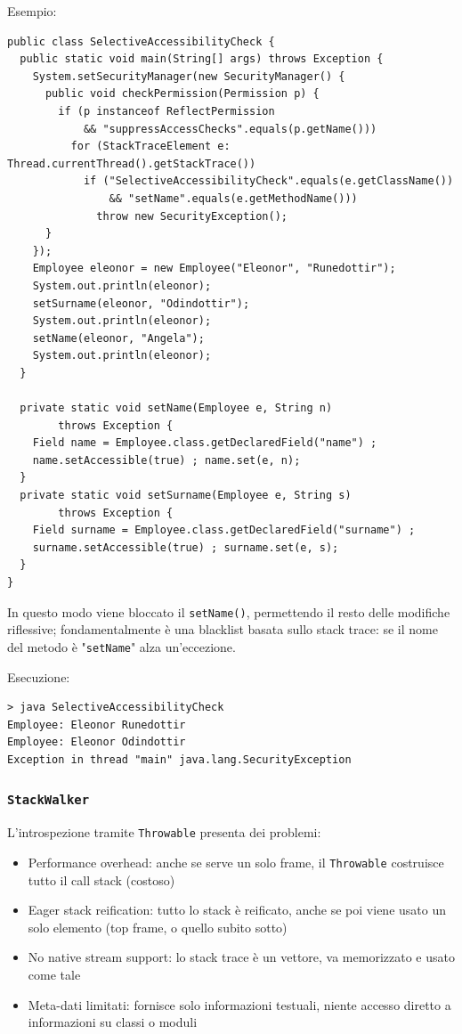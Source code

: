 Esempio:
\begin{verbatim}
public class SelectiveAccessibilityCheck {
  public static void main(String[] args) throws Exception {
    System.setSecurityManager(new SecurityManager() {
      public void checkPermission(Permission p) {
        if (p instanceof ReflectPermission
            && "suppressAccessChecks".equals(p.getName()))
          for (StackTraceElement e: Thread.currentThread().getStackTrace())
            if ("SelectiveAccessibilityCheck".equals(e.getClassName())
                && "setName".equals(e.getMethodName()))
              throw new SecurityException();
      }
    });
    Employee eleonor = new Employee("Eleonor", "Runedottir");
    System.out.println(eleonor);
    setSurname(eleonor, "Odindottir");
    System.out.println(eleonor);
    setName(eleonor, "Angela");
    System.out.println(eleonor);
  }

  private static void setName(Employee e, String n)
        throws Exception {
    Field name = Employee.class.getDeclaredField("name") ;
    name.setAccessible(true) ; name.set(e, n);
  }
  private static void setSurname(Employee e, String s)
        throws Exception {
    Field surname = Employee.class.getDeclaredField("surname") ;
    surname.setAccessible(true) ; surname.set(e, s);
  }
}
\end{verbatim}

In questo modo viene bloccato il \texttt{setName()}, permettendo il resto delle modifiche riflessive; fondamentalmente è una blacklist basata sullo stack trace: se il nome del metodo è "\texttt{setName}" alza un'eccezione.

Esecuzione:
\begin{verbatim}
> java SelectiveAccessibilityCheck
Employee: Eleonor Runedottir
Employee: Eleonor Odindottir
Exception in thread "main" java.lang.SecurityException
\end{verbatim}

\subsubsection{\texttt{StackWalker}}

L'introspezione tramite \texttt{Throwable} presenta dei problemi:
\begin{itemize}
    \item Performance overhead: anche se serve un solo frame, il \texttt{Throwable} costruisce tutto il call stack (costoso)

    \item Eager stack reification: tutto lo stack è reificato, anche se poi viene usato un solo elemento (top frame, o quello subito sotto)

    \item No native stream support: lo stack trace è un vettore, va memorizzato e usato come tale

    \item Meta-dati limitati: fornisce solo informazioni testuali, niente accesso diretto a informazioni su classi o moduli
\end{itemize}

